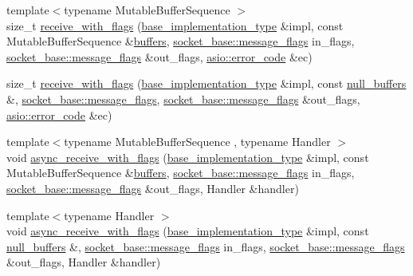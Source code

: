 \begin{DoxyCompactItemize}
{\footnotesize template$<$typename Mutable\+Buffer\+Sequence $>$ }\\size\+\_\+t \hyperlink{classasio_1_1detail_1_1reactive__socket__service__base_a9d7f34d86e6d80304a47a430dfdac1d4}{receive\+\_\+with\+\_\+flags} (\hyperlink{structasio_1_1detail_1_1reactive__socket__service__base_1_1base__implementation__type}{base\+\_\+implementation\+\_\+type} \&impl, const Mutable\+Buffer\+Sequence \&\hyperlink{group__async__read_ga54dede45c3175148a77fe6635222c47d}{buffers}, \hyperlink{classasio_1_1socket__base_ac3cf77465dfedfe1979b5415cf32cc94}{socket\+\_\+base\+::message\+\_\+flags} in\+\_\+flags, \hyperlink{classasio_1_1socket__base_ac3cf77465dfedfe1979b5415cf32cc94}{socket\+\_\+base\+::message\+\_\+flags} \&out\+\_\+flags, \hyperlink{classasio_1_1error__code}{asio\+::error\+\_\+code} \&ec)
\item 
size\+\_\+t \hyperlink{classasio_1_1detail_1_1reactive__socket__service__base_a57f7a732b7faa0675ce3da604af82930}{receive\+\_\+with\+\_\+flags} (\hyperlink{structasio_1_1detail_1_1reactive__socket__service__base_1_1base__implementation__type}{base\+\_\+implementation\+\_\+type} \&impl, const \hyperlink{classasio_1_1null__buffers}{null\+\_\+buffers} \&, \hyperlink{classasio_1_1socket__base_ac3cf77465dfedfe1979b5415cf32cc94}{socket\+\_\+base\+::message\+\_\+flags}, \hyperlink{classasio_1_1socket__base_ac3cf77465dfedfe1979b5415cf32cc94}{socket\+\_\+base\+::message\+\_\+flags} \&out\+\_\+flags, \hyperlink{classasio_1_1error__code}{asio\+::error\+\_\+code} \&ec)
\item 
{\footnotesize template$<$typename Mutable\+Buffer\+Sequence , typename Handler $>$ }\\void \hyperlink{classasio_1_1detail_1_1reactive__socket__service__base_aa39598456d55bcbd36c918f7165c29f3}{async\+\_\+receive\+\_\+with\+\_\+flags} (\hyperlink{structasio_1_1detail_1_1reactive__socket__service__base_1_1base__implementation__type}{base\+\_\+implementation\+\_\+type} \&impl, const Mutable\+Buffer\+Sequence \&\hyperlink{group__async__read_ga54dede45c3175148a77fe6635222c47d}{buffers}, \hyperlink{classasio_1_1socket__base_ac3cf77465dfedfe1979b5415cf32cc94}{socket\+\_\+base\+::message\+\_\+flags} in\+\_\+flags, \hyperlink{classasio_1_1socket__base_ac3cf77465dfedfe1979b5415cf32cc94}{socket\+\_\+base\+::message\+\_\+flags} \&out\+\_\+flags, Handler \&handler)
\item 
{\footnotesize template$<$typename Handler $>$ }\\void \hyperlink{classasio_1_1detail_1_1reactive__socket__service__base_a5a58735866aad8df7365fced7e932af6}{async\+\_\+receive\+\_\+with\+\_\+flags} (\hyperlink{structasio_1_1detail_1_1reactive__socket__service__base_1_1base__implementation__type}{base\+\_\+implementation\+\_\+type} \&impl, const \hyperlink{classasio_1_1null__buffers}{null\+\_\+buffers} \&, \hyperlink{classasio_1_1socket__base_ac3cf77465dfedfe1979b5415cf32cc94}{socket\+\_\+base\+::message\+\_\+flags} in\+\_\+flags, \hyperlink{classasio_1_1socket__base_ac3cf77465dfedfe1979b5415cf32cc94}{socket\+\_\+base\+::message\+\_\+flags} \&out\+\_\+flags, Handler \&handler)
\end{DoxyCompactItemize}
